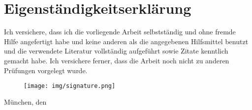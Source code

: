 \newpage
\section{Eigenständigkeitserklärung}
Ich versichere, dass ich die vorliegende Arbeit selbstständig und ohne fremde Hilfe angefertigt habe und keine anderen als die angegebenen Hilfsmittel benutzt und die verwendete Literatur vollständig aufgeführt sowie Zitate kenntlich gemacht habe. Ich versichere ferner, dass die Arbeit noch nicht zu anderen Prüfungen vorgelegt wurde. \\


\begin{figure}[H] 
  \texttt{[image: img/signature.png]}
\end{figure}
München, den \getSubmissionDate